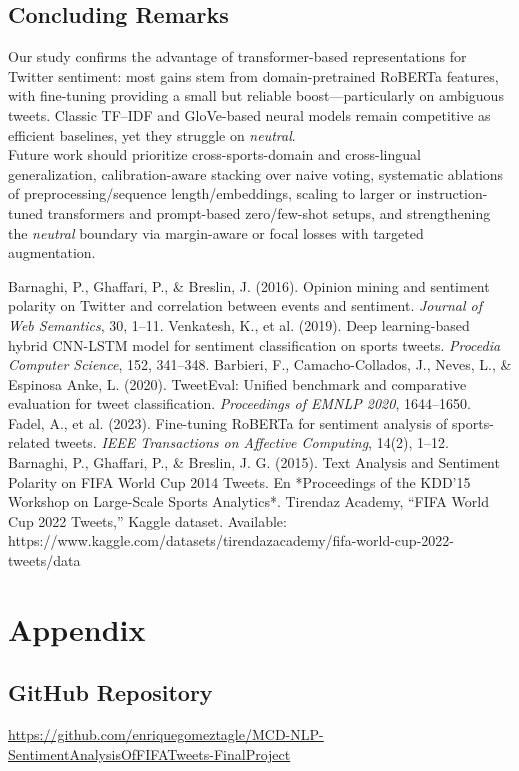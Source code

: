 \documentclass[10pt]{article}
\begin{document}
\subsection{Concluding Remarks}
Our study confirms the advantage of transformer-based representations for Twitter sentiment: most gains stem from domain-pretrained RoBERTa features, with fine-tuning providing a small but reliable boost—particularly on ambiguous tweets. Classic TF--IDF and GloVe-based neural models remain competitive as efficient baselines, yet they struggle on \emph{neutral}.\\
Future work should prioritize cross-sports-domain and cross-lingual generalization, calibration-aware stacking over naive voting, systematic ablations of preprocessing/sequence length/embeddings, scaling to larger or instruction-tuned transformers and prompt-based zero/few-shot setups, and strengthening the \emph{neutral} boundary via margin-aware or focal losses with targeted augmentation.
\begin{thebibliography}{9}
 Barnaghi, P., Ghaffari, P., \& Breslin, J. (2016). Opinion mining and sentiment polarity on Twitter and correlation between events and sentiment. \textit{Journal of Web Semantics}, 30, 1–11.
 Venkatesh, K., et al. (2019). Deep learning-based hybrid CNN-LSTM model for sentiment classification on sports tweets. \textit{Procedia Computer Science}, 152, 341–348.
 Barbieri, F., Camacho-Collados, J., Neves, L., \& Espinosa Anke, L. (2020). TweetEval: Unified benchmark and comparative evaluation for tweet classification. \textit{Proceedings of EMNLP 2020}, 1644–1650.
 Fadel, A., et al. (2023). Fine-tuning RoBERTa for sentiment analysis of sports-related tweets. \textit{IEEE Transactions on Affective Computing}, 14(2), 1–12.
 Barnaghi, P., Ghaffari, P., \& Breslin, J. G. (2015). Text Analysis and Sentiment Polarity on FIFA World Cup 2014 Tweets. En *Proceedings of the KDD’15 Workshop on Large-Scale Sports Analytics*.  
 Tirendaz Academy, “FIFA World Cup 2022 Tweets,” Kaggle dataset. Available: https://www.kaggle.com/datasets/tirendazacademy/fifa-world-cup-2022-tweets/data
\end{thebibliography}
\section{Appendix}
\subsection{GitHub Repository}
\url{https://github.com/enriquegomeztagle/MCD-NLP-SentimentAnalysisOfFIFATweets-FinalProject}
\end{document}
